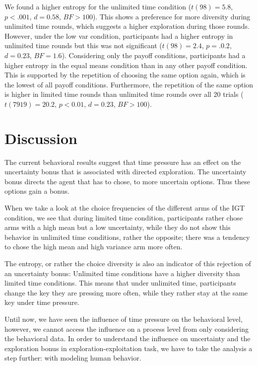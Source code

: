 We found a higher entropy for the unlimited time condition ($t(98)=5.8$, $p<.001$, $d=0.58$, $BF>100$). This shows a preference for more diversity during unlimited time rounds, which suggests a higher exploration during those rounds. However, under the low var condition, participants had a higher entropy in unlimited time rounds but this was not significant ($t(98)=2.4$, $p=.0.2$, $d=0.23$, $BF=1.6$).
Considering only the payoff conditions, participants had a higher entropy in the equal means condition than in any other payoff condition. This is supported by the repetition of choosing the same option again, which is the lowest of all payoff conditions. 
Furthermore, the repetition of the same option is higher in limited time rounds than unlimited time rounds over all 20 trials ($t(7919)=20.2$, $p<0.01$, $d=0.23$, $BF>100$). 

\section{Discussion}
The current behavioral results suggest that time pressure has an effect on the uncertainty bonus that is associated with directed exploration. The uncertainty bonus directs the agent that has to chose, to more uncertain options. Thus these options gain a bonus. 

When we take a look at the choice frequencies of the different arms of the IGT condition, we see that during limited time condition, participants rather chose arms with a high mean but a low uncertainty, while they do not show this behavior in unlimited time conditions, rather the opposite; there was a tendency to chose the high mean and high variance arm more often. 

The entropy, or rather the choice diversity is also an indicator of this rejection of an uncertainty bonus: Unlimited time conditions have a higher diversity than limited time conditions. This means that under unlimited time, participants change the key they are pressing more often, while they rather stay at the same key under time pressure.  

Until now, we have seen the influence of time pressure on the behavioral level, however, we cannot access the influence on a process level from only considering the behavioral data. In order to understand the influence on uncertainty and the exploration bonus in exploration-exploitation task, we have to take the analysis a step further: with modeling human behavior. 
